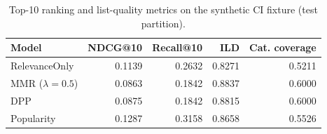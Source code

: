 \begin{table}[h]
\centering
\caption{Top-10 ranking and list-quality metrics on the synthetic CI fixture (test partition).}
\label{tab:results}
\begin{tabular}{lrrrr}
\toprule
Model & NDCG@10 & Recall@10 & ILD & Cat. coverage \\
\midrule
RelevanceOnly & 0.1139 & 0.2632 & 0.8271 & 0.5211 \\
MMR ($\lambda{=}0.5$) & 0.0863 & 0.1842 & 0.8837 & 0.6000 \\
DPP           & 0.0875 & 0.1842 & 0.8815 & 0.6000 \\
Popularity    & 0.1287 & 0.3158 & 0.8658 & 0.5526 \\
\bottomrule
\end{tabular}
\end{table}
